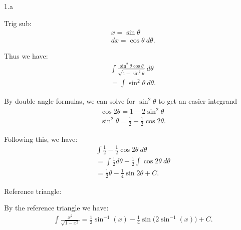 \documentclass{report}
\begin{document}
    \bigbreak \noindent 
    1.a 
    \bigbreak \noindent 
    \begin{minipage}[t]{0.47\textwidth}
        Trig sub:
     \begin{align*}
         &x = \sin{\theta } \\        
        &dx = \cos{\theta }\ d\theta 
    .\end{align*}
    \end{minipage}
    \begin{minipage}[t]{0.47\textwidth}
        Thus we have:
        \begin{align*}
            &\int \frac{\sin^{2}{\theta}\cos{\theta}}{\sqrt{1-\sin^{2}{\theta }}}\ d\theta  \\
            &=\int \sin^{2}{\theta }\ d\theta 
        .\end{align*}
    \end{minipage}
    \bigbreak \noindent 
    \begin{interlude}
       By double angle formulas, we can solve for $\sin^{2}{\theta }$ to get an easier integrand 
       \begin{align*}
           &\cos{2\theta } = 1-2\sin^{2}{\theta } \\
            &\sin^{2}{\theta } = \frac{1}{2}-\frac{1}{2}\cos{2\theta }
       .\end{align*}
    \end{interlude}
    \bigbreak \noindent 
    Following this, we have:
    \begin{align*}
        &\int \frac{1}{2}-\frac{1}{2}\cos{2\theta }\ d\theta  \\
        &=\int \frac{1}{2}d\theta - \frac{1}{2}\int \cos{2\theta }\ d\theta \\
        &= \frac{1}{2}\theta -\frac{1}{4}\sin{2\theta } + C
    .\end{align*}
    \bigbreak \noindent 
    \begin{minipage}[t]{0.47\textwidth}
        Reference triangle:
        \bigbreak \noindent 
    \end{minipage}
    \begin{minipage}[t]{0.4\textwidth}
        By the reference triangle we have:
        \begin{align*}
            &\int \frac{x^{2}}{\sqrt{1-x^{2}}} = \frac{1}{2}\sin^{-1}{(x)} -\frac{1}{4}\sin{(2\sin^{-1}{(x)}}) + C
        .\end{align*}
    \end{minipage}
\end{document}
